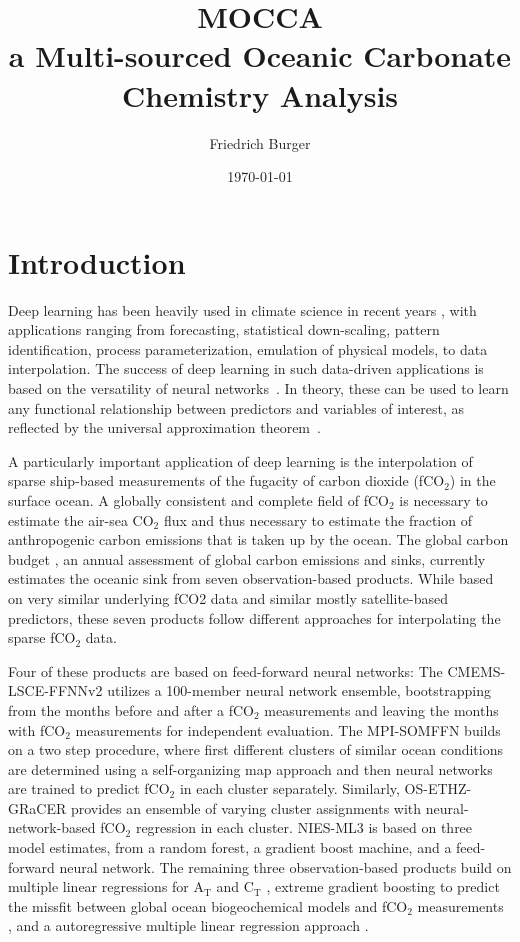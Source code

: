 \documentclass{article}
\title{\textbf{MOCCA} \\[0.25cm]
\large a Multi-sourced Oceanic Carbonate Chemistry Analysis}
\author{Friedrich Burger}
\date{\today}
\begin{document}
	
	\maketitle
	\tableofcontents
	\section{Introduction}
	Deep learning has been heavily used in climate science in recent years \citep{reichstein2019}, with applications ranging from forecasting, statistical down-scaling, pattern identification, process parameterization, emulation of physical models, to data interpolation. The success of deep learning in such data-driven applications is based on the versatility of neural networks~\cite{goodfellow2016}. In theory, these can be used to learn any functional relationship between predictors and variables of interest, as reflected by the universal approximation theorem~\cite{hornik1989}.
	
	A particularly important application of deep learning is the interpolation of sparse ship-based measurements of the fugacity of carbon dioxide (fCO$_2$) in the surface ocean. A globally consistent and complete field of fCO$_2$ is necessary to estimate the air-sea CO$_2$ flux and thus necessary to estimate the fraction of anthropogenic carbon emissions that is taken up by the ocean. The global carbon budget \citep{friedlingstein2023}, an annual assessment of global carbon emissions and sinks, currently estimates the oceanic sink from seven observation-based products. While based on very similar underlying fCO2 data and similar mostly satellite-based predictors, these seven products follow different approaches for interpolating the sparse fCO$_2$ data. 
	
	Four of these products are based on feed-forward neural networks: The CMEMS-LSCE-FFNNv2 \citep{chau2022} utilizes a 100-member neural network ensemble,  bootstrapping from the months before and after a fCO$_2$ measurements and leaving the months with fCO$_2$ measurements for independent evaluation. The MPI-SOMFFN \citep{landschuetzer2016} builds on a two step procedure, where first different clusters of similar ocean conditions are determined using a self-organizing map approach and then neural networks are trained to predict fCO$_2$ in each cluster separately. Similarly, OS-ETHZ-GRaCER \citep{gregor2021} provides an ensemble of varying cluster assignments with neural-network-based fCO$_2$ regression in each cluster. NIES-ML3 \citep{zeng2022} is based on three model estimates, from a random forest, a gradient boost machine, and a feed-forward neural network. The remaining three observation-based products build on multiple linear regressions for A$_\text{T}$ and C$_\text{T}$ \citep[fundamental variables to calculate fCO$_2$ and other carbonate system variables; JMA-MLR;][]{iida2021}, extreme gradient boosting to predict the missfit between global ocean biogeochemical models and fCO$_2$ measurements \citep[LDEO-HPD;][]{gloege2022}, and a autoregressive multiple linear regression approach \citep[Jena-MLS;][]{roedenbeck2022}.
	
\end{document}
